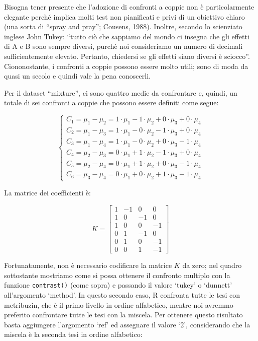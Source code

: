 \documentclass[
  12pt,
]{book}
\begin{document}
Bisogna tener presente che l'adozione di confronti a coppie non è particolarmente elegante perché implica molti test non pianificati e privi di un obiettivo chiaro (una sorta di ``spray and pray''; Cousens, 1988). Inoltre, secondo lo scienziato inglese John Tukey: ``tutto ciò che sappiamo del mondo ci insegna che gli effetti di A e B sono sempre diversi, purchè noi consideriamo un numero di decimali sufficientemente elevato. Pertanto, chiedersi se gli effetti siano diversi è sciocco''. Ciononostante, i confronti a coppie possono essere molto utili; sono di moda da quasi un secolo e quindi vale la pena conoscerli.

Per il dataset ``mixture'', ci sono quattro medie da confrontare e, quindi, un totale di sei confronti a coppie che possono essere definiti come segue:

\[\left\{ {\begin{array}{*{20}{c}}
C_1 = \mu_1 - \mu_2 = 1 \cdot \mu_1 - 1 \cdot \mu_2 + 0 \cdot \mu_3 + 0 \cdot \mu_4 \\
C_2 = \mu_1 - \mu_3 = 1 \cdot \mu_1 - 0 \cdot \mu_2 - 1 \cdot \mu_3 + 0 \cdot \mu_4 \\
C_3 = \mu_1 - \mu_4 = 1 \cdot \mu_1 - 0 \cdot \mu_2 + 0 \cdot \mu_3 - 1 \cdot \mu_4 \\
C_4 = \mu_2 - \mu_3 = 0 \cdot \mu_1 + 1 \cdot \mu_2 - 1 \cdot \mu_3 + 0 \cdot \mu_4 \\
C_5 = \mu_2 - \mu_4 = 0 \cdot \mu_1 + 1 \cdot \mu_2 + 0 \cdot \mu_3 - 1 \cdot \mu_4 \\
C_6 = \mu_3 - \mu_4 = 0 \cdot \mu_1 + 0 \cdot \mu_2 + 1 \cdot \mu_3 - 1 \cdot \mu_4
\end{array}} \right.\]

La matrice dei coefficienti è:

\[K = \left[ {\begin{array}{rrrr}
1 & - 1 & 0 & 0\\
1 & 0 & - 1 & 0\\
1 & 0 & 0 & - 1\\
0 & 1 & - 1 & 0\\
0 & 1 & 0 & - 1\\
0 & 0 & 1 & - 1
\end{array}} \right]\]

Fortunatamente, non è necessario codificare la matrice \(K\) da zero; nel quadro sottostante mostriamo come si possa ottenere il confronto multiplo con la funzione \texttt{contrast()} (come sopra) e passando il valore `tukey' o `dunnett' all'argomento `method'. In questo secondo caso, R confronta tutte le tesi con metribuzin, che è il primo livello in ordine alfabetico, mentre noi avremmo preferito confrontare tutte le tesi con la miscela. Per ottenere questo risultato basta aggiungere l'argomento `ref' ed assegnare il valore `2', considerando che la miscela è la seconda tesi in ordine alfabetico:
\end{document}
